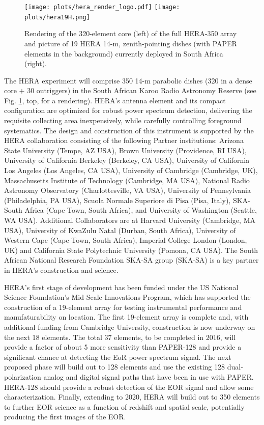 \documentclass[preprint,11pt]{aastex}
\begin{document}
\begin{figure}[h!]
	\centering
	\texttt{[image: plots/hera\_render\_logo.pdf]}
	\texttt{[image: plots/hera19H.png]}
	\caption{Rendering of the 320-element core (left) of the full HERA-350 array and picture of 19 HERA 14-m, zenith-pointing dishes (with PAPER elements in the background) currently deployed in South Africa (right).} 
	\label{fig:HERApictures}
\end{figure}



The HERA experiment will comprise 
350 14-m parabolic dishes (320 in a dense core $+$ 30 outriggers) in the South African Karoo Radio
Astronomy Reserve (see Fig. \ref{fig:HERApictures}, top, for a rendering).
HERA's antenna element and its compact configuration are
optimized for robust power spectrum detection,
delivering the requisite collecting area inexpensively, while carefully controlling foreground systematics.
The design and construction of this instrument is supported by the HERA collaboration 
consisting of the following Partner institutions:  
Arizona State University (Tempe, AZ USA), 
Brown University (Providence, RI USA), 
University of California Berkeley (Berkeley, CA USA), 
University of California Los Angeles (Los Angeles, CA USA), 
University of Cambridge (Cambridge, UK), 
Massachusetts Institute of Technology (Cambridge, MA USA), 
National Radio Astronomy Observatory (Charlottesville, VA USA), 
University of Pennsylvania (Philadelphia, PA USA), 
Scuola Normale Superiore di Pisa (Pisa, Italy),
SKA-South Africa (Cape Town, South Africa), and
University of Washington (Seattle, WA USA).  
Additional Collaborators are at 
Harvard University (Cambridge, MA USA),  
University of KwaZulu Natal (Durban, South Africa), 
University of Western Cape (Cape Town, South Africa), 
Imperial College London  (London, UK) and 
California State Polytechnic University (Pomona, CA USA).
The South African National Research Foundation SKA-SA group (SKA-SA) is a key partner in HERA's construction and science.

HERA's first stage of development has been funded under the US National Science Foundation's Mid-Scale Innovations Program,
which has supported the construction of a 19-element array for testing instrumental performance
and manufaturability on location.  
The first 19-element array is complete and, with additional funding from Cambridge University, 
construction is now underway on the next 18 elements.
The total 37 elements, to be completed in 2016, will provide a factor of about 5 more 
sensitivity than PAPER-128 and provide a significant chance at detecting the EoR power spectrum signal.  The next proposed phase will build out to 128 elements and use the existing 128 dual-polarization analog and digital signal paths that have been in use with PAPER.
HERA-128 should provide a robust detection of the EOR signal and allow some characterization.  Finally, extending to 2020, HERA will build out to 350 elements to further EOR science as a function 
of redshift and spatial scale, potentially producing the first images of the EOR.  
\end{document}

